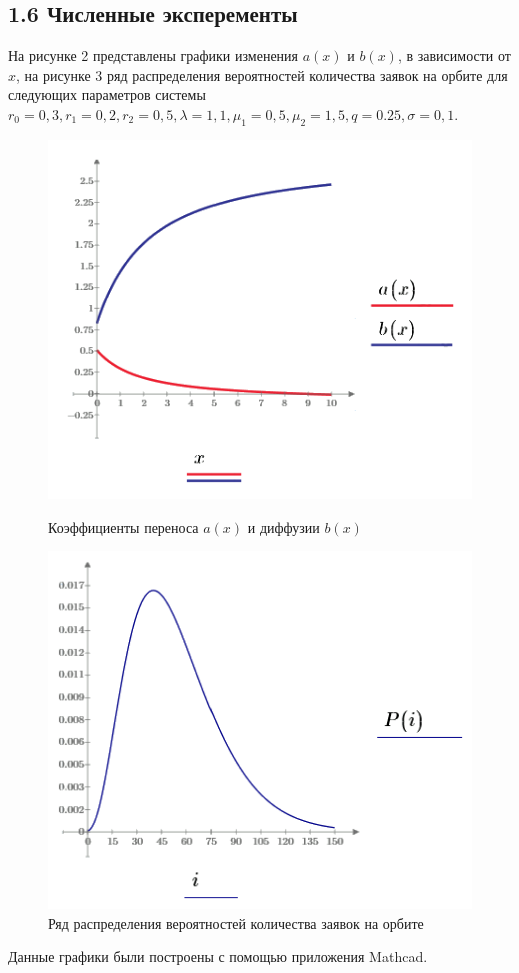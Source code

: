\subsection{1.6 Численные эксперементы}
На рисунке 2 представлены графики изменения $a(x)$ и $b(x)$, в зависимости от $x$, на рисунке 3 ряд распределения вероятностей количества заявок на орбите для следующих параметров системы $r_{0}=0,3, r_{1}=0,2, r_{2}=0,5, \lambda=1,1, \mu_{1}=0,5, \mu_{2}=1,5, q=0.25, \sigma=0,1.$
\begin{figure}[H]
	\centering
	\begin{minipage}[h]{0.49\linewidth}
		\includegraphics[width=0.8\linewidth]{ab_rab} 	
		\caption{Коэффициенты переноса $a(x)$ и диффузии $b(x)$}
		\label{ris:experimoriginal}
	\end{minipage}
	\hfill
	\begin{minipage}[h]{0.49\linewidth}
		\includegraphics[width=0.8\linewidth]{pb_rab} 
		\caption{Ряд распределения вероятностей количества заявок на орбите}
		\label{ris:experimcoded}
	\end{minipage}
\end{figure}
Данные графики были построены с помощью приложения Mathcad.
